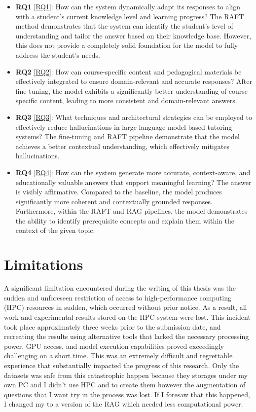 \begin{itemize}
    \item \textbf{RQ1} \ref{RQ1}: How can the system dynamically adapt its responses to align with a student's current knowledge level and learning progress? The RAFT method demonstrates that the system can identify the student's level of understanding and tailor the answer based on their knowledge base. However, this does not provide a completely solid foundation for the model to fully address the student's needs.
    \item \textbf{RQ2} \ref{RQ2}: How can course-specific content and pedagogical materials be effectively integrated to ensure domain-relevant and accurate responses? After fine-tuning, the model exhibits a significantly better understanding of course-specific content, leading to more consistent and domain-relevant answers.
    \item \textbf{RQ3} \ref{RQ3}: What techniques and architectural strategies can be employed to effectively reduce hallucinations in large language model-based tutoring systems? The fine-tuning and RAFT pipeline demonstrate that the model achieves a better contextual understanding, which effectively mitigates hallucinations.
    \item \textbf{RQ4} \ref{RQ4}: How can the system generate more accurate, context-aware, and educationally valuable answers that support meaningful learning? The answer is visibly affirmative. Compared to the baseline, the model produces significantly more coherent and contextually grounded responses. Furthermore, within the RAFT and RAG pipelines, the model demonstrates the ability to identify prerequisite concepts and explain them within the context of the given topic.
\end{itemize}

\section{Limitations}

A significant limitation encountered during the writing of this thesis was the sudden and unforeseen restriction of access to high-performance computing (HPC) resources in sudden, which occurred without prior notice. As a result, all work and experimental results stored on the HPC system were lost. This incident took place approximately three weeks prior to the submission date, and recreating the results using alternative tools that lacked the necessary processing power, GPU access, and model execution capabilities proved exceedingly challenging on a short time. This was an extremely difficult and regrettable experience that substantially impacted the progress of this research. Only the datasets was safe from this catastrophic happen because they storages under my own PC and I didn't use HPC and to create them however the augmentation of questions that I want try in the process was lost. If I foresaw that this happened, I changed my to a version of the RAG which needed less computational power.

